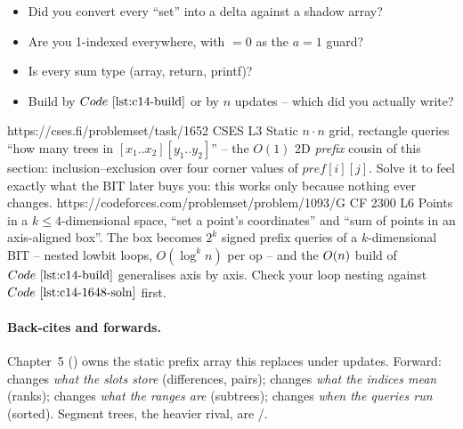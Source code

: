 \begin{stuckbox}
\begin{itemize}[nosep,leftmargin=1.4em]
  \item Did you convert every ``set'' into a delta against a shadow array?
  \item Are you 1-indexed everywhere, with \(=0\) as the
        \(a=1\) guard?
  \item Is every sum type  (array, return, printf)?
  \item Build by \(\coderef{c14-build}\) or by \(n\) updates -- which did
        you actually write?
\end{itemize}
\end{stuckbox}

\begin{practiceset}
    {https://cses.fi/problemset/task/1652}
    {CSES L3}
    {Static \(n\cdot n\) grid, rectangle queries ``how many trees in
     \([x_1..x_2][y_1..y_2]\)'' -- the \(O(1)\) 2D \emph{prefix} cousin of
     this section: inclusion--exclusion over four corner values of
     \(\mathit{pref}[i][j]\).  Solve it to feel exactly what the BIT later
     buys you: this works only because nothing ever changes.}
    {https://codeforces.com/problemset/problem/1093/G}
    {CF 2300 L6}
    {Points in a \(k\le4\)-dimensional space, ``set a point's coordinates''
     and ``sum of points in an axis-aligned box''.  The box becomes
     \(2^k\) signed prefix queries of a \(k\)-dimensional BIT -- nested
     lowbit loops, \(O(\log^k n)\) per op -- and the \(O(n)\) build of
     \(\coderef{c14-build}\) generalises axis by axis.  Check your loop
     nesting against \(\coderef{c14-1648-soln}\) first.}
\end{practiceset}

\paragraph{Back-cites and forwards.}
Chapter~5 () owns the static prefix array this replaces
under updates.  Forward:  changes \emph{what the slots
store} (differences, pairs);  changes \emph{what the
indices mean} (ranks);  changes \emph{what the ranges are}
(subtrees);  changes \emph{when the queries run}
(sorted).  Segment trees, the heavier rival, are /.

